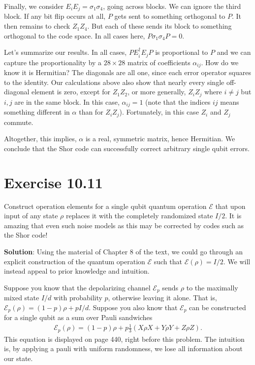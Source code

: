 \documentclass{book}
\newcommand{\mc}[1]{\mathcal{#1}}
\begin{document}
    Finally, we consider $E_i E_j = \sigma_1 \sigma_4$, going across blocks. We can ignore the third block. If any bit flip occurs at all, $P$ gets sent to something orthogonal to $P$. It then remains to check $Z_1 Z_4$. But each of these sends its block to something orthogonal to the code space. In all cases here, $P \sigma_1 \sigma_4 P  = 0$.

    Let's summarize our results. In all cases, $P E_i^\dagger E_j P$ is proportional to $P$ and we can capture the proportionality by a $28 \times 28$ matrix of coefficients $\alpha_{ij}$. How do we know it is Hermitian? The diagonals are all one, since each error operator squares to the identity. Our calculations above also show that nearly every single off-diagonal element is zero, except for $Z_1 Z_2$, or more generally, $Z_i Z_j$ where $i\neq j$ but $i, j$ are in the same block. In this case, $\alpha_{ij}= 1$ (note that the indices $ij$ means something different in $\alpha$ than for $Z_i Z_j$). Fortunately, in this case $Z_i$ and $Z_j$ commute. 
    
    Altogether, this implies, $\alpha$ is a real, symmetric matrix, hence Hermitian. We conclude that the Shor code can successfully correct arbitrary single qubit errors.

\section*{Exercise 10.11}
    Construct operation elements for a single qubit quantum operation $\mc{E}$ that upon input of any state $\rho$ replaces it with the completely randomized state $I/2$. It is amazing that even such noise models as this may be corrected by codes such as the Shor code!

    \textbf{Solution}: Using the material of Chapter 8 of the text, we could go through an explicit construction of the quantum operation $\mc{E}$ such that $\mc{E}(\rho) = I/2$. We will instead appeal to prior knowledge and intuition.

    Suppose you know that the depolarizing channel $\mc{E}_p$ sends $\rho$ to the maximally mixed state $I/d$ with probability $p$, otherwise leaving it alone. That is, $\mc{E}_p (\rho) = (1-p)\rho + p I /d$. Suppose you also know that $\mc{E}_p$ can be constructed for a single qubit as a sum over Pauli sandwiches
    \begin{align}
        \mc{E}_p (\rho) = (1-p)\rho + p \frac{1}{3} (X\rho X + Y \rho Y + Z\rho Z).
    \end{align}
    This equation is displayed on page 440, right before this problem. The intuition is, by applying a pauli with uniform randomness, we lose all information about our state.
\end{document}
